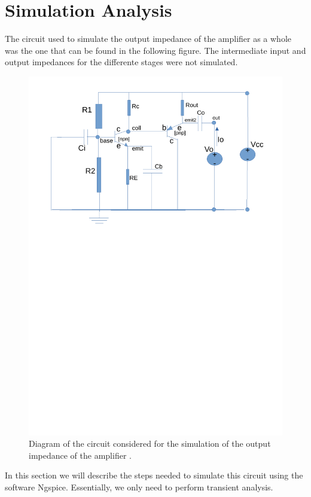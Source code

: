 \section{Simulation Analysis}
\label{sec:simulation}

The circuit used to simulate the output impedance of the amplifier as a whole was the one that can be found in the following figure. The intermediate input and output impedances for the differente stages were not simulated.

\begin{figure}[H] \centering
\includegraphics[width=0.95\linewidth]{diagram_t4_zout.pdf}
\vspace{-8cm}
\caption{Diagram of the circuit considered for the simulation of the output impedance of the amplifier .}
\label{fig:diagram_t4_zout}
\end{figure}

In this section we will describe the steps needed to simulate this circuit using the software Ngspice. Essentially, we only need to perform transient analysis.

